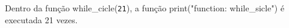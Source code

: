 \documentclass[12pt,varwidth=16cm,border=1pt]{standalone}
\begin{document}
Dentro da função while\_cicle(\verb+21+), a função print("function: while\_sicle") é executada 21 vezes.

\questiomtrue
\end{document}

